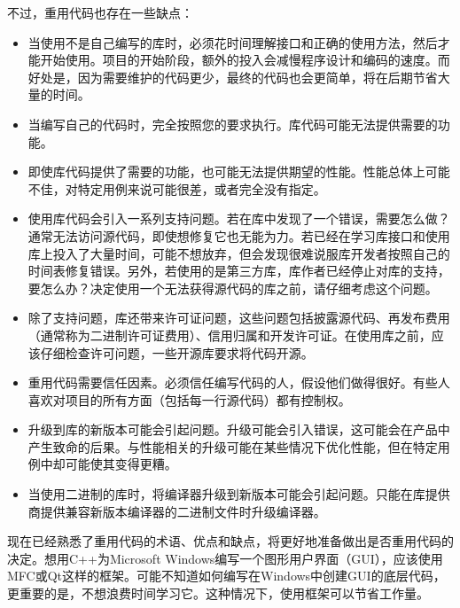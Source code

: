 
不过，重用代码也存在一些缺点：

\begin{itemize}
\item
当使用不是自己编写的库时，必须花时间理解接口和正确的使用方法，然后才能开始使用。项目的开始阶段，额外的投入会减慢程序设计和编码的速度。而好处是，因为需要维护的代码更少，最终的代码也会更简单，将在后期节省大量的时间。

\item
当编写自己的代码时，完全按照您的要求执行。库代码可能无法提供需要的功能。

\item
即使库代码提供了需要的功能，也可能无法提供期望的性能。性能总体上可能不佳，对特定用例来说可能很差，或者完全没有指定。

\item
使用库代码会引入一系列支持问题。若在库中发现了一个错误，需要怎么做？通常无法访问源代码，即使想修复它也无能为力。若已经在学习库接口和使用库上投入了大量时间，可能不想放弃，但会发现很难说服库开发者按照自己的时间表修复错误。另外，若使用的是第三方库，库作者已经停止对库的支持，要怎么办？决定使用一个无法获得源代码的库之前，请仔细考虑这个问题。

\item
除了支持问题，库还带来许可证问题，这些问题包括披露源代码、再发布费用（通常称为二进制许可证费用）、信用归属和开发许可证。在使用库之前，应该仔细检查许可问题，一些开源库要求将代码开源。

\item
重用代码需要信任因素。必须信任编写代码的人，假设他们做得很好。有些人喜欢对项目的所有方面（包括每一行源代码）都有控制权。

\item
升级到库的新版本可能会引起问题。升级可能会引入错误，这可能会在产品中产生致命的后果。与性能相关的升级可能在某些情况下优化性能，但在特定用例中却可能使其变得更糟。

\item
当使用二进制的库时，将编译器升级到新版本可能会引起问题。只能在库提供商提供兼容新版本编译器的二进制文件时升级编译器。
\end{itemize}


现在已经熟悉了重用代码的术语、优点和缺点，将更好地准备做出是否重用代码的决定。想用C++为Microsoft Windows编写一个图形用户界面（GUI），应该使用MFC或Qt这样的框架。可能不知道如何编写在Windows中创建GUI的底层代码，更重要的是，不想浪费时间学习它。这种情况下，使用框架可以节省工作量。

